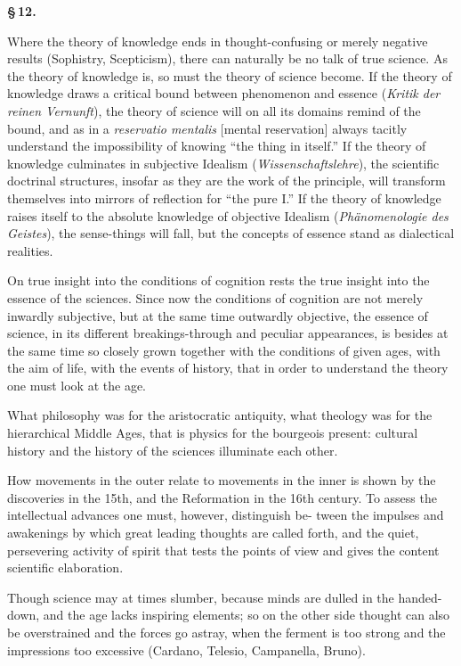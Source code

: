 \documentclass[12pt]{book}
\begin{document}
\begin{center}{\bfseries \S\,12.}\end{center}

Where the theory of knowledge ends in thought-confusing or merely negative results
(Sophistry, Scepticism), there can naturally be no talk of true science. As the theory
of knowledge is, so must the theory of science become. If the theory of knowledge draws
a critical bound between phenomenon and essence (\textit{Kritik der reinen Vernunft}),
the theory of science will on all its domains remind of the bound, and as in a
\textit{reservatio mentalis} [mental reservation] always tacitly understand the
impossibility of knowing ``the thing in itself.'' If the theory of knowledge culminates
in subjective Idealism (\textit{Wissenschaftslehre}), the scientific doctrinal
structures, insofar as they are the work of the principle, will transform themselves
into mirrors of reflection for ``the pure I.'' If the theory of knowledge raises itself
to the absolute knowledge of objective Idealism (\textit{Phänomenologie des Geistes}),
the sense-things will fall, but the concepts of essence stand as dialectical realities.

On true insight into the conditions of cognition rests the true insight into the
essence of the sciences. Since now the conditions of cognition are not merely inwardly
subjective, but at the same time outwardly objective, the essence of science, in its
different breakings-through and peculiar appearances, is besides at the same time so
closely grown together with the conditions of given ages, with the aim of life, with
the events of history, that in order to understand the theory one must look at the age.

What philosophy was for the aristocratic antiquity, what theology was for the
hierarchical Middle Ages, that is physics for the bourgeois present: cultural history
and the history of the sciences illuminate each other.

How movements in the outer relate to movements in the inner is shown by the discoveries
in the 15th, and the Reformation in the 16th century. To assess the intellectual
advances one must, however, distinguish be-
tween the impulses and awakenings by which great leading thoughts are called forth, and
the quiet, persevering activity of spirit that tests the points of view and gives the
content scientific elaboration.

Though science may at times slumber, because minds are dulled in the handed-down, and
the age lacks inspiring elements; so on the other side thought can also be overstrained
and the forces go astray, when the ferment is too strong and the impressions too
excessive (Cardano, Telesio, Campanella, Bruno).
\end{document}
